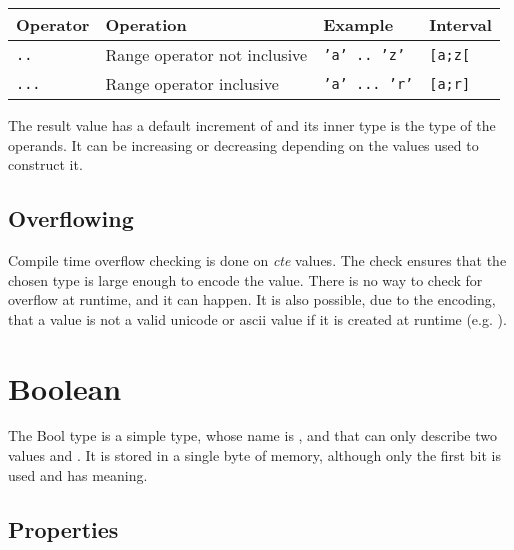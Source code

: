 \begin{itemize}
  \begin{center}
    \begin{adjustbox}{max width=1.0\linewidth}
      \begin{tabular}{|l|lll|}
        \hline
        Operator & Operation & Example & Interval\\[0pt]
        \hline
        \hline
        \texttt{..} & Range operator not inclusive & \texttt{'a' .. 'z'} & \texttt{[a;z[}\\[0pt]
            \texttt{...} & Range operator inclusive & \texttt{'a' ... 'r'} & \texttt{[a;r]}\\[0pt]
            \hline
      \end{tabular}
  \end{adjustbox}\end{center}


  The result value has a default increment of  and its inner type is
  the type of the operands. It can be increasing or decreasing depending on the
  values used to construct it.

\end{itemize}

\subsection{Overflowing}
\label{sec:orga9c18c5}

Compile time overflow checking is done on \textit{cte} values. The check ensures
that the chosen type is large enough to encode the value. There is no way to
check for overflow at runtime, and it can happen. It is also possible, due to
the encoding, that a value is not a valid unicode or ascii value if it is
created at runtime (e.g. ).

\vfill%
\pagebreak

\section{Boolean}
\label{sec:org9f3a743}

The Bool type is a simple type, whose name is , and that can only
describe two values  and . It is stored in a single
byte of memory, although only the first bit is used and has meaning.

\subsection{Properties}
\label{sec:org503bc9e}

